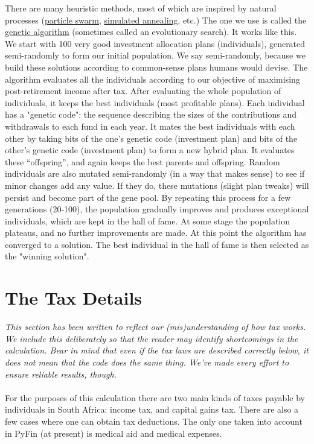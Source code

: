 \documentclass[a4paper, justified]{tufte-handout}
\begin{document}
There are many heuristic methods, most of which are inspired by natural processes (\href{https://en.wikipedia.org/wiki/Particle_swarm_optimization}{particle swarm}, \href{https://en.wikipedia.org/wiki/Simulated_annealing}{simulated annealing}, etc.) The one we use is called the \href{https://en.wikipedia.org/wiki/Genetic_algorithm}{genetic algorithm} (sometimes called an evolutionary search). It works like this. We start with 100 very good investment allocation plans (individuals), generated semi-randomly to form our initial population. We say semi-randomly, because we build these solutions according to common-sense plans humans would devise. The algorithm evaluates all the individuals according to our objective of maximising post-retirement income after tax. After evaluating the whole population of individuals, it keeps the best individuals (most profitable plans). Each individual has a "genetic code": the sequence describing the sizes of the contributions and withdrawals to each fund in each year. It mates the best individuals with each other by taking bits of the one's genetic code (investment plan) and bits of the other's genetic code (investment plan) to form a new hybrid plan. It evaluates these ``offspring'', and again keeps the best parents and offspring. Random individuals are also mutated semi-randomly (in a way that makes sense) to see if minor changes add any value. If they do, these mutations (slight plan tweaks) will persist and become part of the gene pool. By repeating this process for a few generations (20-100), the population gradually improves and produces exceptional individuals, which are kept in the hall of fame. At some stage the population plateaus, and no further improvements are made. At this point the algorithm has converged to a solution. The best individual in the hall of fame is then selected as the "winning solution".

\newpage
\section{The Tax Details}

\textit{This section has been written to reflect our (mis)understanding of how tax works. We include this deliberately so that the reader may identify shortcomings in the calculation. Bear in mind that even if the tax laws are described correctly below, it does not mean that the code does the same thing. We've made every effort to ensure reliable results, though.}\\\\
For the purposes of this calculation there are two main kinds of taxes payable by individuals in South Africa: income tax, and capital gains tax. There are also a few cases where one can obtain tax deductions. The only one taken into account in PyFin (at present) is medical aid and medical expenses.
\end{document}
